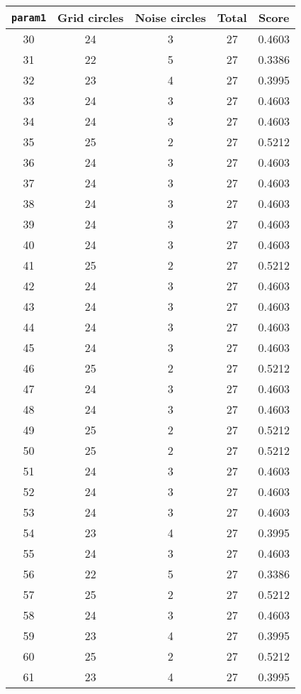 \documentclass[letterpaper, 12pt]{article}
\begin{document}
\begin{longtable}{|c|c|c|c|c|}
\hline
\textbf{\texttt{param1}} & \textbf{Grid circles} & \textbf{Noise circles} & \textbf{Total} & \textbf{Score} \\
\hline
30 & 24 & 3 & 27 & 0.4603 \\
\hline
31 & 22 & 5 & 27 & 0.3386 \\
\hline
32 & 23 & 4 & 27 & 0.3995 \\
\hline
33 & 24 & 3 & 27 & 0.4603 \\
\hline
34 & 24 & 3 & 27 & 0.4603 \\
\hline
35 & 25 & 2 & 27 & 0.5212 \\
\hline
36 & 24 & 3 & 27 & 0.4603 \\
\hline
37 & 24 & 3 & 27 & 0.4603 \\
\hline
38 & 24 & 3 & 27 & 0.4603 \\
\hline
39 & 24 & 3 & 27 & 0.4603 \\
\hline
40 & 24 & 3 & 27 & 0.4603 \\
\hline
41 & 25 & 2 & 27 & 0.5212 \\
\hline
42 & 24 & 3 & 27 & 0.4603 \\
\hline
43 & 24 & 3 & 27 & 0.4603 \\
\hline
44 & 24 & 3 & 27 & 0.4603 \\
\hline
45 & 24 & 3 & 27 & 0.4603 \\
\hline
46 & 25 & 2 & 27 & 0.5212 \\
\hline
47 & 24 & 3 & 27 & 0.4603 \\
\hline
48 & 24 & 3 & 27 & 0.4603 \\
\hline
49 & 25 & 2 & 27 & 0.5212 \\
\hline
50 & 25 & 2 & 27 & 0.5212 \\
\hline
51 & 24 & 3 & 27 & 0.4603 \\
\hline
52 & 24 & 3 & 27 & 0.4603 \\
\hline
53 & 24 & 3 & 27 & 0.4603 \\
\hline
54 & 23 & 4 & 27 & 0.3995 \\
\hline
55 & 24 & 3 & 27 & 0.4603 \\
\hline
56 & 22 & 5 & 27 & 0.3386 \\
\hline
57 & 25 & 2 & 27 & 0.5212 \\
\hline
58 & 24 & 3 & 27 & 0.4603 \\
\hline
59 & 23 & 4 & 27 & 0.3995 \\
\hline
60 & 25 & 2 & 27 & 0.5212 \\
\hline
61 & 23 & 4 & 27 & 0.3995 \\

\end{longtable}
\end{document}
